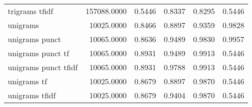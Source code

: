\begin{tabular}{lrrrrr}
trigrams tfidf             & 157088.0000 & 0.5446 &       0.8337 &         0.8295 &               0.5446 \\
unigrams                   &  10025.0000 & 0.8466 &       0.8897 &         0.9359 &               0.9828 \\
unigrams punct             &  10065.0000 & 0.8636 &       0.9489 &         0.9830 &               0.9957 \\
unigrams punct tf          &  10065.0000 & 0.8931 &       0.9489 &         0.9913 &               0.5446 \\
unigrams punct tfidf       &  10065.0000 & 0.8931 &       0.9788 &         0.9913 &               0.5446 \\
unigrams tf                &  10025.0000 & 0.8679 &       0.8897 &         0.9870 &               0.5446 \\
unigrams tfidf             &  10025.0000 & 0.8679 &       0.9404 &         0.9870 &               0.5446 \\
\bottomrule
\end{tabular}
